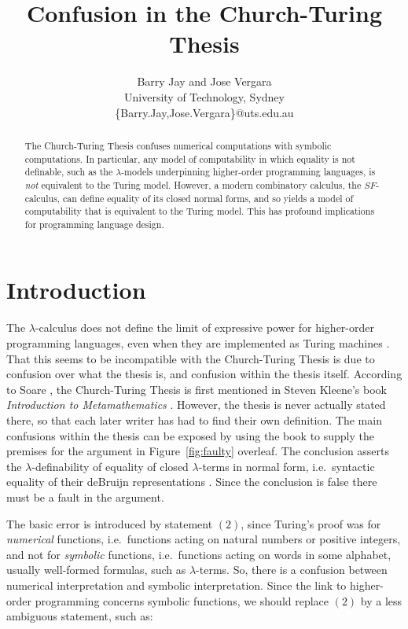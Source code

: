 \documentclass[a4paper]{article}
\title{Confusion in the Church-Turing Thesis }
\author{Barry Jay and Jose Vergara \\
 University of Technology, Sydney \\
\{Barry.Jay,Jose.Vergara\}@uts.edu.au}
\begin{document}
\maketitle
\makeatactive

\begin{abstract}

  The Church-Turing Thesis confuses numerical computations with
  symbolic computations. In particular, any model of computability in
  which equality is not definable, such as the $\lambda$-models
  underpinning higher-order programming languages, is {\em not}
  equivalent to the Turing model. However, a modern combinatory
  calculus, the $SF$-calculus, can define equality of its closed
  normal forms, and so yields a model of computability that is
  equivalent to the Turing model. This has profound implications for
  programming language design.
\end{abstract}



\section{Introduction}
\label{sec:intro}



The $\lambda$-calculus \cite{Church41,Bare84a} does not define the limit of
expressive power for higher-order programming languages, even when
they are implemented as Turing machines \cite{Turing36}. That this
seems to be incompatible with the Church-Turing Thesis is due to
confusion over what the thesis is, and confusion within the thesis
itself.  According to Soare \cite[page 11]{soare1999history}, the
Church-Turing Thesis is first mentioned in Steven Kleene's book {\em
  Introduction to Metamathematics} \cite{Kleene52}. However, the
thesis is never actually stated there, so that each later writer has
had to find their own definition. The main confusions within the
thesis can be exposed by using the book to supply the premises for the
argument in Figure~\ref{fig:faulty} overleaf. The conclusion asserts
the $\lambda$-definability of equality of closed $\lambda$-terms in normal form,
i.e.\ syntactic equality of their deBruijn representations
\cite{deBruijn}.  Since the conclusion is false \cite[page
519]{Bare84a} there must be a fault in the argument. 

The basic error is introduced by statement $(2)$, since Turing's proof
was for {\em numerical} functions, i.e.\ functions acting on natural
numbers or positive integers, and not for {\em symbolic} functions,
i.e.\ functions acting on words in some alphabet, usually well-formed
formulas, such as $\lambda$-terms.  So, there is a confusion between
numerical interpretation and symbolic interpretation. Since the link
to higher-order programming concerns symbolic functions, we should
replace $(2)$ by a less ambiguous statement, such as:
\end{document}
